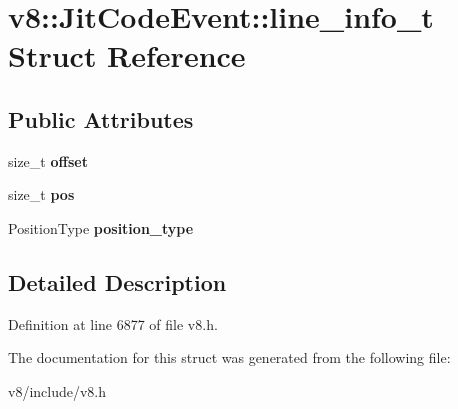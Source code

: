 \hypertarget{structv8_1_1JitCodeEvent_1_1line__info__t}{}\section{v8\+:\+:Jit\+Code\+Event\+:\+:line\+\_\+info\+\_\+t Struct Reference}
\label{structv8_1_1JitCodeEvent_1_1line__info__t}
\subsection*{Public Attributes}
\begin{DoxyCompactItemize}
\item 
\mbox{\label{structv8_1_1JitCodeEvent_1_1line__info__t_a084f165114adc594e838ef5fe0c879d6}} 
size\+\_\+t {\bfseries offset}
\item 
\mbox{\label{structv8_1_1JitCodeEvent_1_1line__info__t_aad9a3d593ffa9b647b31b67f60ad19f2}} 
size\+\_\+t {\bfseries pos}
\item 
\mbox{\label{structv8_1_1JitCodeEvent_1_1line__info__t_ad8a0e551ed2b67096a3fe2f64e2b77a2}} 
Position\+Type {\bfseries position\+\_\+type}
\end{DoxyCompactItemize}


\subsection{Detailed Description}


Definition at line 6877 of file v8.\+h.



The documentation for this struct was generated from the following file\+:\begin{DoxyCompactItemize}
\item 
v8/include/v8.\+h\end{DoxyCompactItemize}

